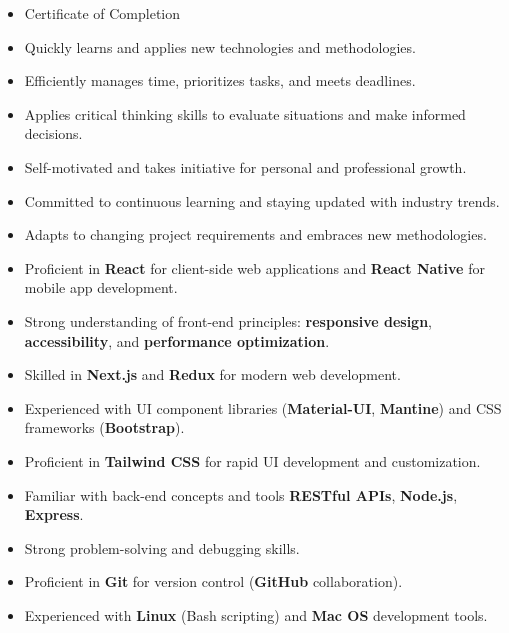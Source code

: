 \documentclass[10pt,a4paper,withhyper]{altacv}
\begin{document}
\begin{paracol}{2}
  \begin{itemize}
    \item Certificate of Completion
  \end{itemize}
  \begin{itemize}
    \item Quickly learns and applies new technologies and methodologies.
    \item Efficiently manages time, prioritizes tasks, and meets deadlines.
    \item Applies critical thinking skills to evaluate situations and make informed decisions.
    \item Self-motivated and takes initiative for personal and professional growth.
    \item Committed to continuous learning and staying updated with industry trends.
    \item Adapts to changing project requirements and embraces new methodologies.
  \end{itemize}
  \divider
  \begin{itemize}
    \item Proficient in \textbf{React} for client-side web applications and \textbf{React Native} for mobile app development.
    \item Strong understanding of front-end principles: \textbf{responsive design}, \textbf{accessibility}, and \textbf{performance optimization}.
    \item Skilled in \textbf{Next.js} and \textbf{Redux} for modern web development.
    \item Experienced with UI component libraries (\textbf{Material-UI}, \textbf{Mantine}) and CSS frameworks (\textbf{Bootstrap}).
    \item Proficient in \textbf{Tailwind CSS} for rapid UI development and customization.
    \item Familiar with back-end concepts and tools \textbf{RESTful APIs}, \textbf{Node.js}, \textbf{Express}.
    \item Strong problem-solving and debugging skills.
    \item Proficient in \textbf{Git} for version control (\textbf{GitHub} collaboration).
    \item Experienced with \textbf{Linux} (Bash scripting) and \textbf{Mac OS} development tools.
  \end{itemize}

\end{paracol}
\end{document}
